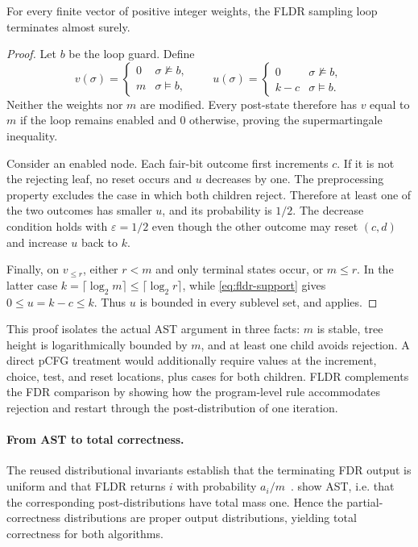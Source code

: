 \begin{theorem}
\label{thm:fldr}
For every finite vector of positive integer weights, the FLDR sampling loop terminates almost surely.
\end{theorem}
\begin{proof}
Let $b$ be the loop guard. Define
\[
 v(\sigma)=\begin{cases}0&\sigma\not\models b,\\m&\sigma\models b,\end{cases}
 \qquad
 u(\sigma)=\begin{cases}0&\sigma\not\models b,\\k-c&\sigma\models b.\end{cases}
\]
Neither the weights nor $m$ are modified. Every post-state therefore has $v$ equal to $m$ if the loop remains enabled and $0$ otherwise, proving the supermartingale inequality.

Consider an enabled node. Each fair-bit outcome first increments $c$. If it is not the rejecting leaf, no reset occurs and $u$ decreases by one. The preprocessing property excludes the case in which both children reject. Therefore at least one of the two outcomes has smaller $u$, and its probability is $1/2$. The decrease condition holds with $\varepsilon=1/2$ even though the other outcome may reset $(c,d)$ and increase $u$ back to $k$.

Finally, on $v_{\le r}$, either $r<m$ and only terminal states occur, or $m\le r$. In the latter case $k=\lceil\log_2m\rceil\le\lceil\log_2r\rceil$, while \eqref{eq:fldr-support} gives $0\le u=k-c\le k$. Thus $u$ is bounded in every sublevel set, and  applies.
\end{proof}

This proof isolates the actual AST argument in three facts: $m$ is stable, tree height is logarithmically bounded by $m$, and at least one child avoids rejection. A direct pCFG treatment would additionally require values at the increment, choice, test, and reset locations, plus cases for both children. FLDR complements the FDR comparison by showing how the program-level rule accommodates rejection and restart through the post-distribution of one iteration.

\paragraph{From AST to total correctness.}
The reused distributional invariants establish that the terminating FDR output is uniform and that FLDR returns $i$ with probability $a_i/m$~\cite{zilken2026verifyingsamplingalgorithmsdistributional}.  show AST, i.e. that the corresponding post-distributions have total mass one. Hence the partial-correctness distributions are proper output distributions, yielding total correctness for both algorithms.



